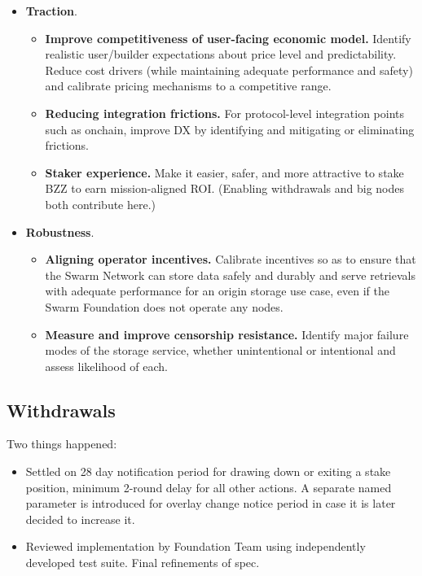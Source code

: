 \begin{itemize}
  \item \textbf{Traction}.
  \begin{itemize}
    \item \textbf{Improve competitiveness of user-facing economic model.} 
      Identify realistic user/builder expectations about price level and predictability. Reduce cost drivers (while maintaining adequate performance and safety) and calibrate pricing mechanisms to a competitive range.
    \item \textbf{Reducing integration frictions.} 
      For protocol-level integration points such as onchain, improve DX by identifying and mitigating or eliminating frictions.
    \item \textbf{Staker experience.} 
      Make it easier, safer, and more attractive to stake BZZ to earn mission-aligned ROI.
      (Enabling withdrawals and big nodes both contribute here.)
  \end{itemize}
  \item \textbf{Robustness}. 
  \begin{itemize}
    \item \textbf{Aligning operator incentives.} 
      Calibrate incentives so as to ensure that the Swarm Network can store data safely and durably and serve retrievals with adequate performance for an origin storage use case, even if the Swarm Foundation does not operate any nodes.
    \item \textbf{Measure and improve censorship resistance.} 
      Identify major failure modes of the storage service, whether unintentional or intentional and assess likelihood of each. 
  \end{itemize}

\end{itemize}

\subsection*{Withdrawals}

Two things happened:
\begin{itemize}
  \item Settled on 28 day notification period for drawing down or exiting a stake position, minimum 2-round delay for all other actions. A separate named parameter is introduced for overlay change notice period in case it is later decided to increase it.
  \item Reviewed implementation by Foundation Team using independently developed test suite. Final refinements of spec.
\end{itemize}


